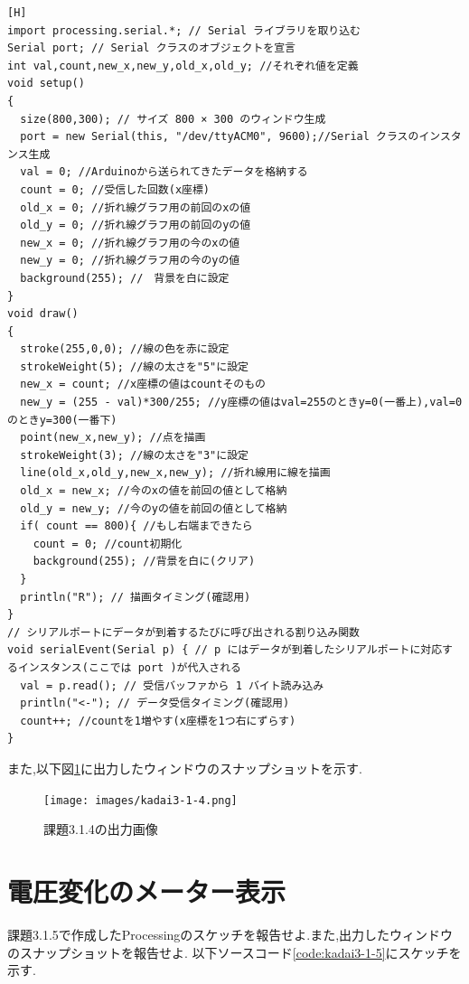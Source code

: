 \documentclass{jarticle}
\begin{document}
\begin{lstlisting}[caption = 課題3.1.4,label=code:kadai3-1-4][H]
import processing.serial.*; // Serial ライブラリを取り込む
Serial port; // Serial クラスのオブジェクトを宣言
int val,count,new_x,new_y,old_x,old_y; //それぞれ値を定義
void setup()
{
  size(800,300); // サイズ 800 × 300 のウィンドウ生成
  port = new Serial(this, "/dev/ttyACM0", 9600);//Serial クラスのインスタンス生成
  val = 0; //Arduinoから送られてきたデータを格納する
  count = 0; //受信した回数(x座標)
  old_x = 0; //折れ線グラフ用の前回のxの値
  old_y = 0; //折れ線グラフ用の前回のyの値
  new_x = 0; //折れ線グラフ用の今のxの値
  new_y = 0; //折れ線グラフ用の今のyの値
  background(255); //　背景を白に設定
}
void draw()
{
  stroke(255,0,0); //線の色を赤に設定
  strokeWeight(5); //線の太さを"5"に設定
  new_x = count; //x座標の値はcountそのもの
  new_y = (255 - val)*300/255; //y座標の値はval=255のときy=0(一番上),val=0のときy=300(一番下)
  point(new_x,new_y); //点を描画
  strokeWeight(3); //線の太さを"3"に設定
  line(old_x,old_y,new_x,new_y); //折れ線用に線を描画
  old_x = new_x; //今のxの値を前回の値として格納
  old_y = new_y; //今のyの値を前回の値として格納
  if( count == 800){ //もし右端まできたら
    count = 0; //count初期化
    background(255); //背景を白に(クリア)
  }
  println("R"); // 描画タイミング(確認用)
}
// シリアルポートにデータが到着するたびに呼び出される割り込み関数
void serialEvent(Serial p) { // p にはデータが到着したシリアルポートに対応するインスタンス(ここでは port )が代入される
  val = p.read(); // 受信バッファから 1 バイト読み込み
  println("<-"); // データ受信タイミング(確認用)
  count++; //countを1増やす(x座標を1つ右にずらす)
}
\end{lstlisting}
また,以下図\ref{fig:kadai3-1-4}に出力したウィンドウのスナップショットを示す.

\begin{figure}[H]
\begin{center}
\texttt{[image: images/kadai3-1-4.png]}
\caption{課題3.1.4の出力画像}
\label{fig:kadai3-1-4}
\end{center}
\end{figure}

\section{電圧変化のメーター表示}
課題3.1.5で作成したProcessingのスケッチを報告せよ.また,出力したウィンドウのスナップショットを報告せよ.
以下ソースコード\ref{code:kadai3-1-5}にスケッチを示す.
\end{document}
